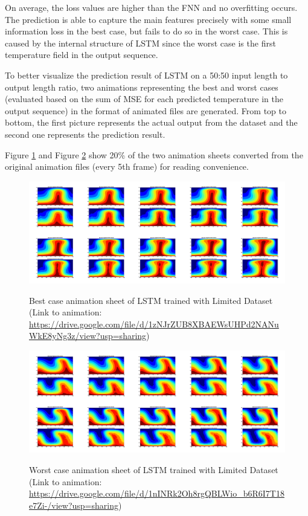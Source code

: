 On average, the loss values are higher than the FNN and no overfitting occurs. The prediction is able to capture the main features precisely with some small information loss in the best case, but fails to do so in the worst case. This is caused by the internal structure of LSTM since the worst case is the first temperature field in the output sequence.

To better visualize the prediction result of LSTM on a 50:50 input length to output length ratio, two animations representing the best and worst cases (evaluated based on the sum of MSE for each predicted temperature in the output sequence) in the format of animated files are generated. From top to bottom, the first picture represents the actual output from the dataset and the second one represents the prediction result.

Figure \ref{figure:LSTM_limited_best_gif} and Figure \ref{figure:LSTM_limited_worst_gif} show 20\% of the two animation sheets converted from the original animation files (every 5th frame) for reading convenience.

\begin{figure}[H]
    \centering
    \caption{Best case animation sheet of LSTM trained with Limited Dataset (Link to animation: \url{https://drive.google.com/file/d/1zNJrZUB8XBAEWsUHPd2NANuWkE8yNg3z/view?usp=sharing})}
    \includegraphics[scale=0.10]{figures/mantle_convection_images/limited_dataset/LSTM_Best_GIF_sheet.png}
    \label{figure:LSTM_limited_best_gif}
\end{figure}



\begin{figure}[H]
    \centering
    \caption{Worst case animation sheet of LSTM trained with Limited Dataset (Link to animation: 
    \url{https://drive.google.com/file/d/1nINRk2Oh8rgQBLWio_b6R6I7T18e7Zi-/view?usp=sharing})}
    \includegraphics[scale=0.10]{figures/mantle_convection_images/limited_dataset/LSTM_Worst_GIF_sheet.png}
    \label{figure:LSTM_limited_worst_gif}
\end{figure}

